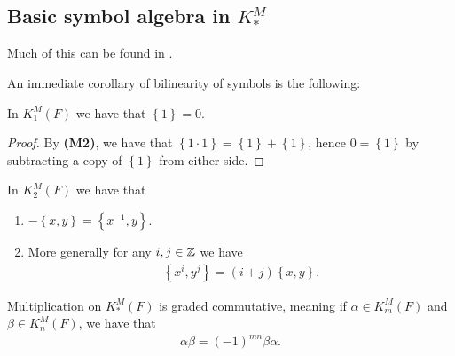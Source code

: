 \documentclass[11pt,openany]{book}
\begin{document}
\subsection{Basic symbol algebra in $K_\ast^M$}

Much of this can be found in \cite[\S7.1]{GS}.


An immediate corollary of bilinearity of symbols is the following:

\begin{proposition} In $K_1^M(F)$ we have that $\left\{ 1 \right\} = 0$.
\end{proposition}
\begin{proof} By \textbf{(M2)}, we have that $\left\{ 1\cdot 1 \right\} = \left\{ 1 \right\} + \left\{ 1 \right\}$, hence $0 = \left\{ 1 \right\}$ by subtracting a copy of $\left\{ 1 \right\}$ from either side.
\end{proof}

\begin{proposition}\label{prop:powers-symbols} 
In $K_2^M(F)$ we have that
\begin{enumerate}
    \item $-\left\{ x,y \right\} = \left\{ x^{-1},y \right\}$.
    \item More generally for any $i,j\in \mathbb{Z}$ we have
    \begin{align*}
         \left\{ x^i,y^j \right\} = (i+j) \left\{ x,y \right\}.
    \end{align*}
\end{enumerate}
\end{proposition}





\begin{proposition} \cite[1.1]{MilnorK}
Multiplication on $K_\ast^M(F)$ is graded commutative, meaning if $\alpha \in K_m^M(F)$ and $\beta \in K_n^M(F)$, we have that
\begin{align*}
    \alpha\beta = (-1)^{mn}\beta\alpha.
\end{align*}
\end{proposition}
\end{document}
